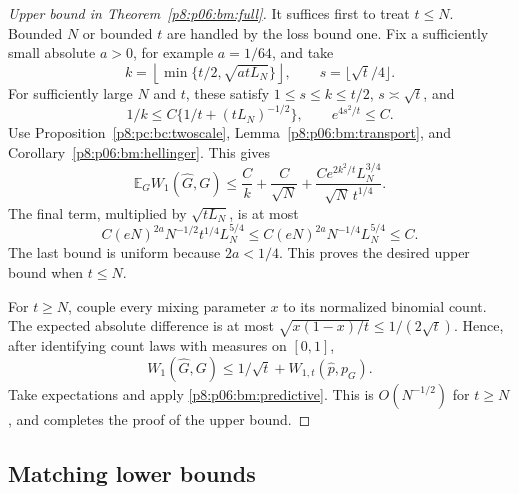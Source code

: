 \documentclass[11pt,a4paper]{article}
\theoremstyle{definition}
\theoremstyle{remark}
\numberwithin{equation}{section}
\begin{document}
\begin{proof}[Upper bound in Theorem~\ref{p8:p06:bm:full}]
It suffices first to treat $t\le N$. Bounded $N$ or bounded $t$ are handled
by the loss bound one. Fix a sufficiently small absolute $a>0$, for
example $a=1/64$, and take
\[
 k=\left\lfloor\min\{t/2,\sqrt{atL_N}\}\right\rfloor,
 \qquad s=\lfloor\sqrt t/4\rfloor.
\]
For sufficiently large $N$ and $t$, these satisfy
$1\le s\le k\le t/2$, $s\asymp\sqrt t$, and
\[
 1/k\le C\{1/t+(tL_N)^{-1/2}\},\qquad e^{4s^2/t}\le C.
\]
Use Proposition~\ref{p8:pc:bc:twoscale}, Lemma~\ref{p8:p06:bm:transport}, and
Corollary~\ref{p8:p06:bm:hellinger}. This gives
\begin{equation}\label{p8:p06:bm:master}
 \mathbb E_G W_1(\widehat G,G)
 \le \frac Ck+\frac C{\sqrt N}
       +\frac{Ce^{2k^2/t}L_N^{3/4}}{\sqrt N\,t^{1/4}}.
\end{equation}
The final term, multiplied by $\sqrt{tL_N}$, is at most
\[
 C(eN)^{2a}N^{-1/2}t^{1/4}L_N^{5/4}
 \le C(eN)^{2a}N^{-1/4}L_N^{5/4}\le C.
\]
The last bound is uniform because $2a<1/4$. This proves the desired
upper bound when $t\le N$.

For $t\ge N$, couple every mixing parameter $x$ to its normalized
binomial count. The expected absolute difference is at most
$\sqrt{x(1-x)/t}\le1/(2\sqrt t)$. Hence, after identifying count laws
with measures on $[0,1]$,
\[
 W_1(\widehat G,G)
 \le 1/\sqrt t+W_{1,t}(\widehat p,p_G).
\]
Take expectations and apply \eqref{p8:p06:bm:predictive}. This is $O(N^{-1/2})$
for $t\ge N$, and completes the proof of the upper bound.
\end{proof}

\subsection{Matching lower bounds}
\end{document}
